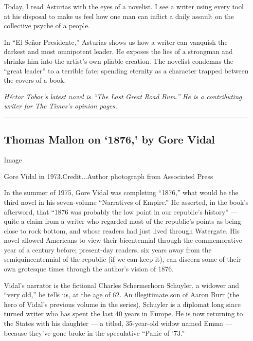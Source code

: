 Today, I read Asturias with the eyes of a novelist. I see a writer using
every tool at his disposal to make us feel how one man can inflict a
daily assault on the collective psyche of a people.

In ``El Señor Presidente,'' Asturias shows us how a writer can vanquish
the darkest and most omnipotent leader. He exposes the lies of a
strongman and shrinks him into the artist's own pliable creation. The
novelist condemns the ``great leader'' to a terrible fate: spending
eternity as a character trapped between the covers of a book.

\emph{Héctor Tobar's latest novel is ``The Last Great Road Bum.'' He is
a contributing writer for The Times's opinion pages.}

\begin{center}\rule{0.5\linewidth}{\linethickness}\end{center}

\hypertarget{thomas-mallon-on-1876-by-gore-vidal}{%
\subsection{Thomas Mallon on `1876,' by Gore
Vidal}\label{thomas-mallon-on-1876-by-gore-vidal}}

Image

Gore Vidal in 1973.Credit...Author photograph from Associated Press

In the summer of 1975, Gore Vidal was completing ``1876,'' what would be
the third novel in his seven-volume ``Narratives of Empire.'' He
asserted, in the book's afterword, that ``1876 was probably the low
point in our republic's history'' --- quite a claim from a writer who
regarded most of the republic's points as being close to rock bottom,
and whose readers had just lived through Watergate. His novel allowed
Americans to view their bicentennial through the commemorative year of a
century before; present-day readers, six years away from the
semiquincentennial of the republic (if we can keep it), can discern some
of their own grotesque times through the author's vision of 1876.

Vidal's narrator is the fictional Charles Schermerhorn Schuyler, a
widower and ``very old,'' he tells us, at the age of 62. An illegitimate
son of Aaron Burr (the hero of Vidal's previous volume in the series),
Schuyler is a diplomat long since turned writer who has spent the last
40 years in Europe. He is now returning to the States with his daughter
--- a titled, 35-year-old widow named Emma --- because they've gone
broke in the speculative ``Panic of '73.''

